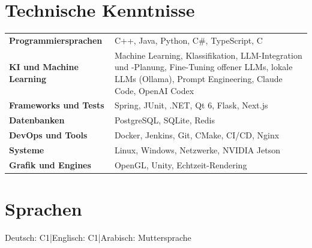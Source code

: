 \documentclass[10pt,a4paper]{article}
\begin{document}
\section{Technische Kenntnisse}
{\small\renewcommand{\arraystretch}{1.15}
\begin{tabularx}{\linewidth}{@{}>{\bfseries}p{4.6cm}X@{}}
Programmiersprachen & C++, Java, Python, C\#, TypeScript, C \\
KI und Machine Learning & Machine Learning, Klassifikation, LLM-Integration und -Planung, Fine-Tuning offener LLMs, lokale LLMs (Ollama), Prompt Engineering, Claude Code, OpenAI Codex \\
Frameworks und Tests & Spring, JUnit, .NET, Qt 6, Flask, Next.js \\
Datenbanken & PostgreSQL, SQLite, Redis \\
DevOps und Tools & Docker, Jenkins, Git, CMake, CI/CD, Nginx \\
Systeme & Linux, Windows, Netzwerke, NVIDIA Jetson \\
Grafik und Engines & OpenGL, Unity, Echtzeit-Rendering \\
\end{tabularx}\par}

\section{Sprachen}
{\small Deutsch: C1\enspace\textcolor{rule}{|}\enspace Englisch: C1\enspace\textcolor{rule}{|}\enspace Arabisch: Muttersprache\par}
\end{document}
